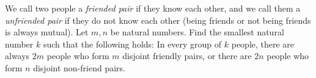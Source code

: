 We call two people a \emph{friended pair} if they know each other, and we call
them a \emph{unfriended pair} if they do not know each other (being friends or not
being friends is always mutual). Let $m,n$ be natural numbers.
Find the smallest natural number $k$ such that the following holds:
In every group of $k$ people, there are always $2m$ people who form $m$ disjoint friendly pairs,
or there are $2n$ people who form $n$ disjoint non-friend pairs.
